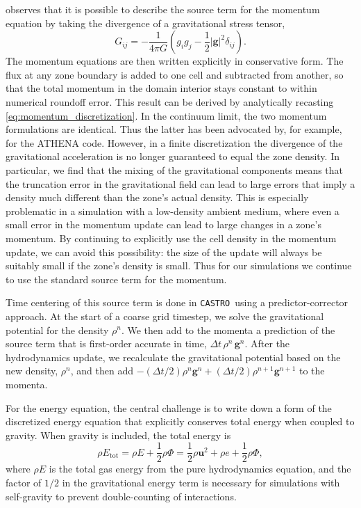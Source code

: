 \documentclass[iop]{../emulateapj}
\newcommand{\castro}{\texttt{CASTRO}}
\begin{document}
\citet[Chapter 4]{shu:1992} observes that it is possible to describe the source term 
for the momentum equation by taking the divergence of a gravitational stress tensor,
\begin{equation}
  G_{ij} = -\frac{1}{4\pi G}\left(g_i g_j - \frac{1}{2}|\mathbf{g}|^2\delta_{ij}\right).
\end{equation}
The momentum equations are then written explicitly in conservative form.
The flux at any zone boundary is added to one cell and
subtracted from another, so that the total momentum in the domain interior stays constant to
within numerical roundoff error. This result can be derived by analytically recasting 
\autoref{eq:momentum_discretization}. In the continuum limit, the two momentum
formulations are identical. Thus the latter has been advocated by, for example, 
\cite{jiang:2013} for the ATHENA code. However, in a finite discretization 
the divergence of the gravitational acceleration is no longer guaranteed to equal
the zone density. In particular, we find that the mixing of the gravitational components
means that the truncation error in the gravitational field can lead to large errors
that imply a density much different than the zone's actual density. This is especially
problematic in a simulation with a low-density ambient medium, where even a small error 
in the momentum update can lead to large changes in a zone's momentum. By continuing to explicitly
use the cell density in the momentum update, we can avoid this possibility: the size of the update
will always be suitably small if the zone's density is small. Thus for our simulations
we continue to use the standard source term for the momentum.

Time centering of this source term is done in \castro\ using a predictor-corrector approach.
At the start of a coarse grid timestep, we solve the gravitational potential for the density $\rho^n$.
We then add to the momenta a prediction of the source term that is first-order accurate in time, 
$\Delta t\, \rho^n\, \mathbf{g}^n$. After the hydrodynamics update, we recalculate
the gravitational potential based on the new density, $\rho^n$, and then add 
$-(\Delta t/2) \rho^n \mathbf{g}^n + (\Delta t/2) \rho^{n+1} \mathbf{g}^{n+1}$ to the momenta.

For the energy equation, the central challenge is to write down a form of the 
discretized energy equation that explicitly conserves total energy when 
coupled to gravity. When gravity is included, the total energy is
\begin{equation}
  \rho E_{\text{tot}} = \rho E + \frac{1}{2}\rho\Phi = \frac{1}{2}\rho \mathbf{u}^2 + \rho e + \frac{1}{2}\rho\Phi, \label{eq:total_energy_gravity}
\end{equation}
where $\rho E$ is the total gas energy from the pure hydrodynamics equation,
and the factor of $1/2$ in the gravitational energy term is necessary
for simulations with self-gravity to prevent double-counting of
interactions.
\end{document}
